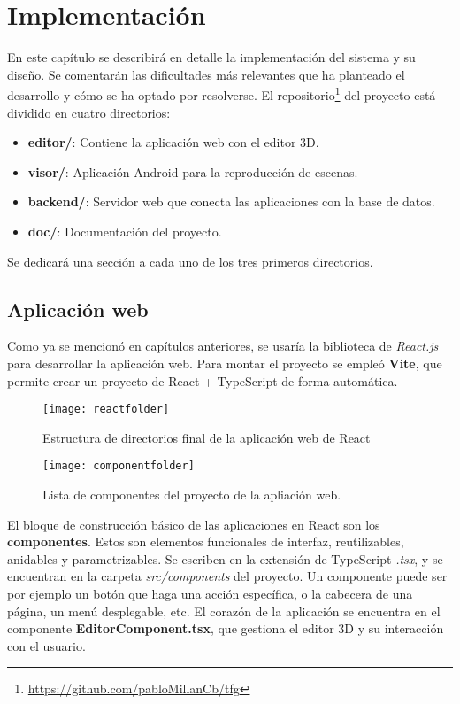 \chapter{Implementación}

En este capítulo se describirá en detalle la implementación del sistema y su diseño. Se comentarán las dificultades más relevantes que ha planteado el desarrollo y cómo se ha optado por resolverse. El repositorio\footnote{\url{https://github.com/pabloMillanCb/tfg}} del proyecto está dividido en cuatro directorios:

\begin{itemize}
    \item \textbf{editor/}: Contiene la aplicación web con el editor 3D.
    \item \textbf{visor/}: Aplicación Android para la reproducción de escenas.
    \item \textbf{backend/}: Servidor web que conecta las aplicaciones con la base de datos.
    \item \textbf{doc/}: Documentación del proyecto.
\end{itemize}

Se dedicará una sección a cada uno de los tres primeros directorios.


\section{Aplicación web}

Como ya se mencionó en capítulos anteriores, se usaría la biblioteca de \textit{React.js}\cite{react} para desarrollar la aplicación web. Para montar el proyecto se empleó \textbf{Vite}\cite{vite}, que permite crear un proyecto de React + TypeScript de forma automática.

\begin{figure}[h]
    \centering
    \texttt{[image: reactfolder]}
    \caption[Estructura de directorios de React]{Estructura de directorios final de la aplicación web de React}
\end{figure}

\begin{figure}[h]
    \centering
    \texttt{[image: componentfolder]}
    \caption[Componentes del proyecto React]{Lista de componentes del proyecto de la apliación web.}
\end{figure}

El bloque de construcción básico de las aplicaciones en React son los \textbf{componentes}. Estos son elementos funcionales de interfaz, reutilizables, anidables y parametrizables. Se escriben en la extensión de TypeScript \textit{.tsx}, y se encuentran en la carpeta \textit{src/components} del proyecto. Un componente puede ser por ejemplo un botón que haga una acción específica, o la cabecera de una página, un menú desplegable, etc. El corazón de la aplicación se encuentra en el componente \textbf{EditorComponent.tsx}, que gestiona el editor 3D y su interacción con el usuario.

